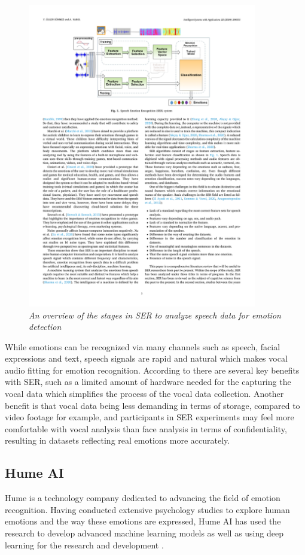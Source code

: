 \begin{figure}[ht]
    \centering
    \includegraphics[width=10cm]{png/theoretical/ser-diagram.pdf}
    \caption{\textit{An overview of the stages in SER to analyze speech data for emotion detection} \autocite{LGENSNMEZ2024}}
    \label{fig:stages-SER}
\end{figure}
 
While emotions can be recognized via many channels such as speech, facial expressions and text, speech signals are rapid and natural which makes vocal audio fitting for emotion recognition. According to \autocite{LGENSNMEZ2024} there are several key benefits with SER, such as a limited amount of hardware needed for the capturing the vocal data which simplifies the process of the vocal data collection. Another benefit is that vocal data being less demanding in terms of storage, compared to video footage for example, and participants in SER experiments may feel more comfortable with vocal analysis than face analysis in terms of confidentiality, resulting in datasets reflecting real emotions more accurately.

\subsection{Hume AI }

Hume is a technology company dedicated to advancing the field of emotion recognition. Having conducted extensive psychology studies to explore human emotions and the way these emotions are expressed, Hume AI has used the research to develop advanced machine learning models \autocite{HumeAi-aboutScience} as well as using deep learning for the research and development \autocite{Brooks2023}.

